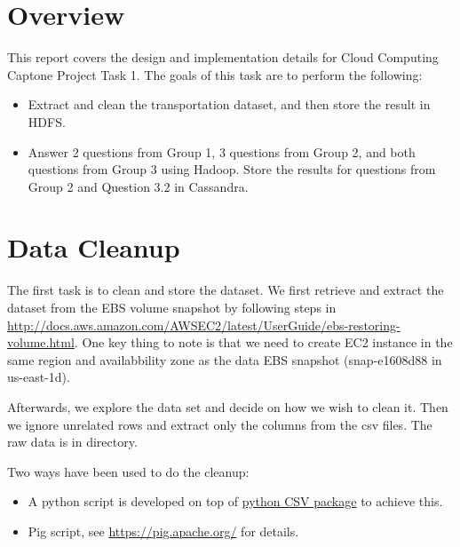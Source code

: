 \documentclass[fontsize=11pt,paper=a4,pagesize=auto]{scrbook}
\begin{document}
\lstset{
  language=C,
  basicstyle=\small,
  breaklines=true}
    
  

\section{Overview}
This report covers the design and implementation details for Cloud Computing Captone Project Task 1. The goals of this task are to perform the following:
\begin{itemize}
\item Extract and clean the transportation dataset, and then store the result in HDFS.
\item Answer 2 questions from Group 1, 3 questions from Group 2, and both questions from Group 3 using Hadoop. Store the results for questions from Group 2 and Question 3.2 in Cassandra.   
\end{itemize}
 
\section{Data Cleanup}
\par The first task is to clean and store the dataset. We  first retrieve and extract the dataset from the EBS volume snapshot by following steps in \url{http://docs.aws.amazon.com/AWSEC2/latest/UserGuide/ebs-restoring-volume.html}. One key thing to note is that we need to create EC2 instance in the same region and availabbility zone as the data EBS snapshot (snap-e1608d88 in us-east-1d).   
\par Afterwards, we explore the data set and decide on how we wish to clean it. Then we ignore unrelated rows and extract only the columns from the csv files. The raw data is in 
directory. 
\par Two ways have been used to do the cleanup: 
\begin{itemize} 
\item A python script is developed on top of \href{https://docs.python.org/2/library/csv.html}{python CSV package} to achieve this. 
\item Pig script, see \url{https://pig.apache.org/} for details. 
\end{itemize}
\end{document}
